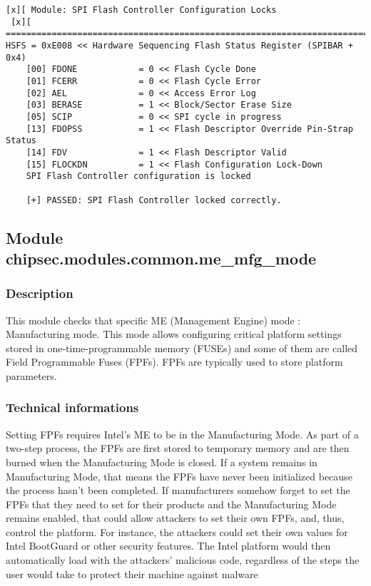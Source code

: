 \begin{verbatim}
[x][ Module: SPI Flash Controller Configuration Locks
 [x][ =======================================================================
HSFS = 0xE008 << Hardware Sequencing Flash Status Register (SPIBAR + 0x4)
    [00] FDONE            = 0 << Flash Cycle Done 
    [01] FCERR            = 0 << Flash Cycle Error 
    [02] AEL              = 0 << Access Error Log 
    [03] BERASE           = 1 << Block/Sector Erase Size 
    [05] SCIP             = 0 << SPI cycle in progress 
    [13] FDOPSS           = 1 << Flash Descriptor Override Pin-Strap Status 
    [14] FDV              = 1 << Flash Descriptor Valid 
    [15] FLOCKDN          = 1 << Flash Configuration Lock-Down
    SPI Flash Controller configuration is locked

    [+] PASSED: SPI Flash Controller locked correctly.
\end{verbatim}

\hypertarget{module-chipsec.modules.common.me_mfg_mode}{%
\subsection{Module
chipsec.modules.common.me\_mfg\_mode}\label{module-chipsec.modules.common.me_mfg_mode}}

\hypertarget{description-4}{%
\subsubsection{Description}\label{description-4}}

This module checks that specific ME (Management Engine) mode :
Manufacturing mode. This mode allows configuring critical platform
settings stored in one-time-programmable memory (FUSEs) and some of them
are called Field Programmable Fuses (FPFs). FPFs are typically used to
store platform parameters.

\hypertarget{technical-informations-4}{%
\subsubsection{Technical informations}\label{technical-informations-4}}

Setting FPFs requires Intel's ME to be in the Manufacturing Mode. As
part of a two-step process, the FPFs are first stored to temporary
memory and are then burned when the Manufacturing Mode is closed. If a
system remains in Manufacturing Mode, that means the FPFs have never
been initialized because the process hasn't been completed. If
manufacturers somehow forget to set the FPFs that they need to set for
their products and the Manufacturing Mode remains enabled, that could
allow attackers to set their own FPFs, and, thus, control the platform.
For instance, the attackers could set their own values for Intel
BootGuard or other security features. The Intel platform would then
automatically load with the attackers' malicious code, regardless of the
steps the user would take to protect their machine against malware


